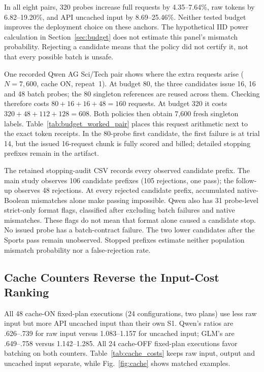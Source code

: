 In all eight pairs, 320 probes increase full requests by 4.35--7.64\%, raw tokens by 6.82--19.20\%, and API uncached input by 8.69--25.46\%. Neither tested budget improves the deployment choice on these anchors. The hypothetical IID power calculation in Section~\ref{sec:budget} does not estimate this panel's mismatch probability. Rejecting a candidate means that the policy did not certify it, not that every possible batch is unsafe.

One recorded Qwen AG Sci/Tech pair shows where the extra requests arise ($N=7,600$, cache ON, repeat~1). At budget 80, the three candidates issue 16, 16 and 48 batch probes; the 80 singleton references are reused across them. Checking therefore costs $80+16+16+48=160$ requests. At budget 320 it costs $320+48+112+128=608$. Both policies then obtain 7,600 fresh singleton labels. Table~\ref{tab:budget_worked_pair} places this request arithmetic next to the exact token receipts. In the 80-probe first candidate, the first failure is at trial 14, but the issued 16-request chunk is fully scored and billed; detailed stopping prefixes remain in the artifact.



The retained stopping-audit CSV records every observed candidate prefix. The main study observes 106 candidate prefixes (105 rejections, one pass); the follow-up observes 48 rejections. At every rejected candidate prefix, accumulated native-Boolean mismatches alone make passing impossible. Qwen also has 31 probe-level strict-only format flags, classified after excluding batch failures and native mismatches. These flags do not mean that format alone caused a candidate stop. No issued probe has a batch-contract failure. The two lower candidates after the Sports pass remain unobserved. Stopped prefixes estimate neither population mismatch probability nor a false-rejection rate.


\subsection{Cache Counters Reverse the Input-Cost Ranking}
\label{sec:cache_results}
All 48 cache-ON fixed-plan executions (24 configurations, two plans) use less raw input but more API uncached input than their own S1. Qwen's ratios are .626--.739 for raw input versus 1.083--1.157 for uncached input; GLM's are .649--.758 versus 1.142--1.285. All 24 cache-OFF fixed-plan executions favor batching on both counters. Table~\ref{tab:cache_costs} keeps raw input, output and uncached input separate, while Fig.~\ref{fig:cache} shows matched examples.



